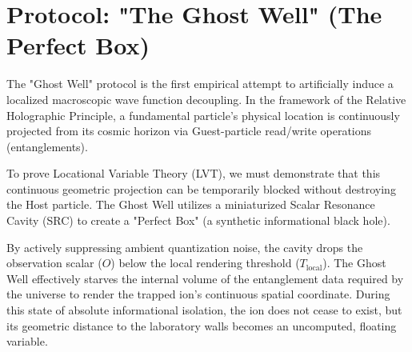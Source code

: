 \documentclass[12pt,a4paper]{article}
\begin{document}
\section{Protocol: "The Ghost Well" (The Perfect Box)}

\vspace{0.5em}
\noindent{}
\vspace{1em}

The "Ghost Well" protocol is the first empirical attempt to artificially induce a localized macroscopic wave function decoupling. In the framework of the Relative Holographic Principle, a fundamental particle's physical location is continuously projected from its cosmic horizon via Guest-particle read/write operations (entanglements). 

To prove Locational Variable Theory (LVT), we must demonstrate that this continuous geometric projection can be temporarily blocked without destroying the Host particle. The Ghost Well utilizes a miniaturized Scalar Resonance Cavity (SRC) to create a "Perfect Box" (a synthetic informational black hole). 

By actively suppressing ambient quantization noise, the cavity drops the observation scalar ($O$) below the local rendering threshold ($T_{\mathrm{local}}$). The Ghost Well effectively starves the internal volume of the entanglement data required by the universe to render the trapped ion's continuous spatial coordinate. During this state of absolute informational isolation, the ion does not cease to exist, but its geometric distance to the laboratory walls becomes an uncomputed, floating variable.
\end{document}

